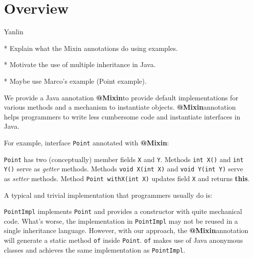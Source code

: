\documentclass[preprint]{llncs}
\makeatletter
\newcommand\mixin{\textbf{@Mixin}}
\makeatother
\begin{document}
\section{Overview}\label{sec:ep}
Yanlin

* Explain what the Mixin annotations do using examples. 

* Motivate the use of multiple inheritance in Java.

* Maybe use Marco's example (Point example).

We provide a Java annotation \mixin to provide default implementations for
various methods and a mechanism to instantiate objects. \mixin annotation helps
programmers to write less cumbersome code and instantiate interfaces in Java.

For example, interface \texttt{Point} annotated with \mixin:


\texttt{Point} has two (conceptually) member fields \texttt{X} and
\texttt{Y}. Methods \texttt{int X()} and \texttt{int Y()} serve as \emph{getter}
methods. Methods \texttt{void X(int X)} and \texttt{void Y(int Y)} serve as
\emph{setter} methods. Method \texttt{Point withX(int X)} updates field
\texttt{X} and returns \textbf{this}.

A typical and trivial implementation that programmers usually do is:


\texttt{PointImpl} implements \texttt{Point} and provides a constructor with
quite mechanical code. What's worse, the implementation in \texttt{PointImpl}
may not be reused in a single inheritance language. However, with our approach,
the \mixin annotation will generate a static method \texttt{of} inside
\texttt{Point}. \texttt{of} makes use of Java anonymous classes and achieves the
same implementation as \texttt{PointImpl}.

\end{document}
